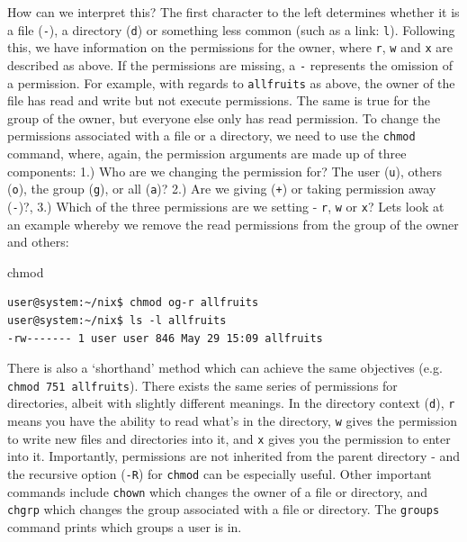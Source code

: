 \documentclass[11pt]{article}
\begin{document}
How can we interpret this? The first character to the left determines whether it is a file (\texttt{-}), a directory (\texttt{d}) or something less common (such as a link: \texttt{l}).  Following this, we have information on the permissions for the owner, where \texttt{r}, \texttt{w} and \texttt{x} are described as above. If the permissions are missing, a \texttt{-} represents the omission of a permission. For example, with regards to \texttt{allfruits} as above, the owner of the file has read and write but not execute permissions. The same is true for the group of the owner, but everyone else only has read permission. To change the permissions associated with a file or a directory, we need to use the \texttt{chmod} command, where, again, the permission arguments are made up of three components: 1.) Who are we changing the permission for? The user (\texttt{u}), others (\texttt{o}), the group (\texttt{g}), or all (\texttt{a})? 2.) Are we giving (\texttt{+}) or taking permission away (\texttt{-})?, 3.) Which of the three permissions are we setting - \texttt{r}, \texttt{w} or \texttt{x}? Lets look at an example whereby we remove the read permissions from the group of the owner and others:\\

\begin{listing}[H]
\caption{chmod}\vspace{-0.1in}
\begin{verbatim}
user@system:~/nix$ chmod og-r allfruits
user@system:~/nix$ ls -l allfruits
-rw------- 1 user user 846 May 29 15:09 allfruits
\end{verbatim}
\end{listing}

There is also a `shorthand' method which can achieve the same objectives (e.g. \texttt{chmod 751 allfruits}). There exists the same series of permissions for directories, albeit with slightly different meanings.  In the directory context (\texttt{d}), \texttt{r} means you have the ability to read what's in the directory, \texttt{w} gives the permission to write new files and directories into it, and \texttt{x} gives you the permission to enter into it. Importantly,  permissions are not inherited from the parent directory - and the recursive option (\texttt{-R}) for \texttt{chmod} can be especially useful. Other important commands include  \texttt{chown} which changes the owner of a file or directory, and \texttt{chgrp} which changes the group associated with a file or directory. The \texttt{groups} command prints which groups a user is in.
\end{document}
